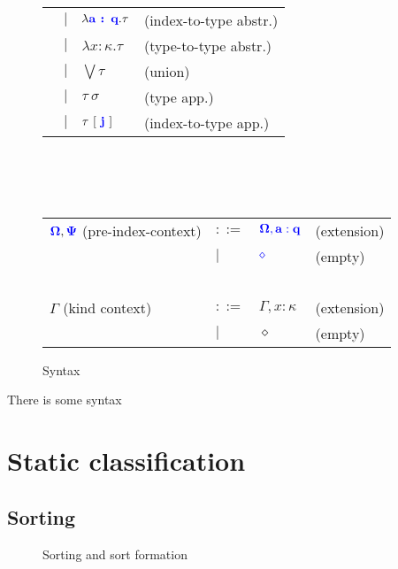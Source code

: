 \documentclass[sigplan,10pt,review,anonymous]{acmart}
\newcommand{\blu}[1]{\textbf{\color{blue}{#1}}}
\newcommand{\blum}[1]{\mathbf{\color{blue}{#1}}}
\begin{document}
\begin{figure}
\begin{tabular}{llll}
       & $\mid$ & $\lambda \blu{a : q} . \tau$ & (index-to-type abstr.) \\
       & $\mid$ & $\lambda x : \kappa. \tau$ & (type-to-type abstr.) \\
       & $\mid$ & $\bigvee \tau$ & (union) \\
       & $\mid$ & $\tau~\sigma$ & (type app.) \\
       & $\mid$ & $\tau~[~\blu{j}~]$ & (index-to-type app.) 
\end{tabular}\\~\\~\\
\begin{tabular}{llll}
$\blum{\Omega}, \blum{\Psi}$ (pre-index-context) & $::=$  & $\blum{\Omega,a : q}$ & (extension) \\
                                     & $\mid$ & $\blum{\diamond}$ & (empty) \\~\\
$\Gamma$ (kind context) & $::=$ & $\Gamma,x : \kappa$ & (extension) \\
                        & $\mid$ & $\diamond$ & (empty) 
\end{tabular}
\caption{Syntax}
\label{fig:syntax}
\end{figure}

There is some syntax

\section{Static classification}

\subsection{Sorting}

\begin{figure}
\caption{Sorting and sort formation}
\label{fig:sorting}
\end{figure}
\end{document}
